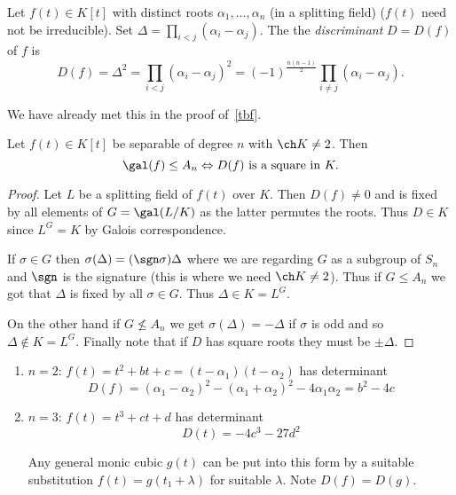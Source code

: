 \documentclass[a4paper]{article}
\begin{document}
\begin{definition}[Discriminant]
  Let \(f(t) \in K[t]\) with distinct roots \(\alpha_1, \dots, \alpha_n\) (in a splitting field) (\(f(t)\) need not be irreducible). Set \(\Delta = \prod_{i < j}(\alpha_i - \alpha_j)\). The the \emph{discriminant} \(D = D(f)\) of \(f\) is
  \[
    D(f) = \Delta^2 = \prod_{i < j}(\alpha_i - \alpha_j)^2 = (-1)^{\frac{n(n-1)}{2}} \prod_{i \neq j}(\alpha_i - \alpha_j).
  \]
\end{definition}

\begin{remark}
  We have already met this in the proof of~\ref{tbf}.
\end{remark}

\begin{lemma}
  Let \(f(t) \in K[t]\) be separable of degree \(n\) with \(\ch K \neq 2\). Then
  \[
    \gal(f) \leq A_n \Leftrightarrow D(f) \text{ is a square in } K.
  \]
\end{lemma}

\begin{proof}
  Let \(L\) be a splitting field of \(f(t)\) over \(K\). Then \(D(f) \neq 0\) and is fixed by all elements of \(G = \gal(L/K)\) as the latter permutes the roots. Thus \(D \in K\) since \(L^G = K\) by Galois correspondence.

  If \(\sigma \in G\) then \(\sigma(\Delta) = (\sgn \sigma) \Delta\) where we are regarding \(G\) as a subgroup of \(S_n\) and \(\sgn\) is the signature (this is where we need \(\ch K \neq 2\)). Thus if \(G \leq A_n\) we got that \(\Delta\) is fixed by all \(\sigma \in G\). Thus \(\Delta \in K = L^G\).

  On the other hand if \(G \nleq A_n\) we get \(\sigma(\Delta) = -\Delta\) if \(\sigma\) is odd and so \(\Delta \notin K = L^G\). Finally note that if \(D\) has square roots they must be \(\pm \Delta\).
\end{proof}

\begin{eg}\leavevmode
  \begin{enumerate}
  \item \(n = 2\): \(f(t) =t^2 + bt + c = (t - \alpha_1)(t - \alpha_2)\) has determinant
    \[
      D(f) = (\alpha_1 - \alpha_2)^2 - (\alpha_1 + \alpha_2)^2 - 4\alpha_1\alpha_2 = b^2 - 4c
    \]
  \item \(n = 3\): \(f(t) = t^3 + ct + d\) has determinant
    \[
      D(t) = -4c^3 - 27d^2
   \]
   \begin{remark}
     Any general monic cubic \(g(t)\) can be put into this form by a suitable substitution \(f(t) = g(t_1 + \lambda)\) for suitable \(\lambda\). Note \(D(f) = D(g)\).
   \end{remark}
 \end{enumerate}
\end{eg}
\end{document}
